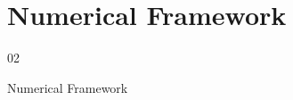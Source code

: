 \section[Framework]{Numerical Framework}

\begin{frame}[plain]
\centering
{\Large 02\par}
\vspace{0.5cm}
{\LARGE Numerical Framework\par}
\end{frame}


